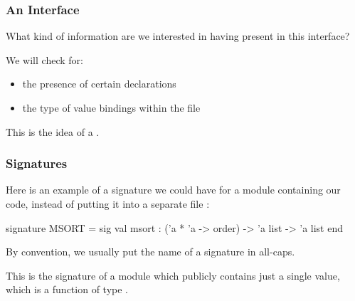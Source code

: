 \documentclass[aspectratio=169, handout]{beamer}
\begin{document}
\begin{frame}[fragile]
  \frametitle{An Interface}


  \pause
  \vspace{\fill}

  What kind of information are we interested in having present in this interface?

  \pause
  \vspace{\fill}

  We will check for:
  \pause
  \begin{itemize}
    \item the presence of certain declarations \pause
    \item the type of value bindings within the file
  \end{itemize}

  \pause
  \vspace{\fill}

  This is the idea of a .
\end{frame}


\begin{frame}[fragile]
  \frametitle{Signatures}


  \pause
  \vspace{\fill}

  Here is an example of a signature we could have for a module containing our
   code, instead of putting it into a separate file :

  \begin{codeblock}
    signature MSORT =
      sig
        val msort : ('a * 'a -> order) -> 'a list -> 'a list
      end
  \end{codeblock}

  \vspace{\fill}

  By convention, we usually put the name of a signature in all-caps.

  \pause
  \vspace{\fill}

  This is the signature of a module which publicly contains just a single value,
  which is a function  of type .
\end{frame}
\end{document}
